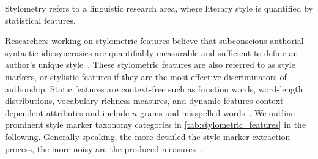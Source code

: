 
\begin{definition}
    [Stylometry]
    Stylometry refers to a linguistic research area, where literary style is quantified by statistical features.
\end{definition}
Researchers working on stylometric features believe that subconscious authorial syntactic idiosyncrasies are quantifiably measurable and sufficient to define an author's unique style~\citep{neal_surveying_2018}. 
These stylometric features are also referred to as style markers, or stylistic features if they are the most effective discriminators of authorship. 
Static features are context-free such as function words, word-length distributions, vocabulary richness measures, and dynamic features context-dependent attributes and include $n$-grams and misspelled words~\citep{abbasi_writeprints_2008}.
We outline prominent style marker taxonomy categories in \autoref{tab:stylometric_features} in the following. 
Generally speaking, the more detailed the style marker extraction process, the more noisy are the produced measures~\citep{stamatatos_survey_2009}.

